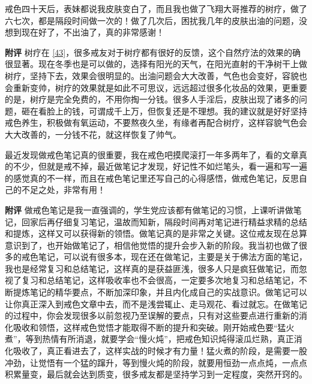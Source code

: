 \begin{case}
    戒色四十天后，表妹都说我皮肤变白了，而且我也做了飞翔大哥推荐的树疗，做了六七次，都是隔段时间做一次的！做了几次后，困扰我几年的皮肤出油的问题，没想到现在好了，不出油了，真的非常感谢！

    \textbf{附评} 树疗在 \ref{43}，很多戒友对于树疗都有很好的反馈，这个自然疗法的效果的确很显著。现在冬季也是可以做的，选择有阳光的天气，在阳光直射的干净树干上做树疗，坚持下去，效果会很明显的。出油问题会大大改善，气色也会变好，容貌也会重新变帅，树疗的效果就是如此不可思议，远远超过很多化妆品的效果，更重要的是，树疗是完全免费的，不用你掏一分钱。很多人手淫后，皮肤出现了诸多的问题，砸在看脸上的钱，可谓成千上万，但恢复还是不理想。我的建议就是好好坚持戒色养生，积极做有氧运动，不要熬夜久坐，有缘者再配合树疗，这样容貌气色会大大改善的，一分钱不花，就这样恢复了帅气。
\end{case}

\begin{case}
    最近发现做戒色笔记真的很重要，我在戒色吧摸爬滚打一年多两年了，看的文章真的不少，但就是戒不掉，最近做笔记才发现，好记性不如烂笔头，看一遍和写一遍的感觉真的不一样，而且在戒色笔记里还写自己的心得感悟，做戒色笔记，反思自己的不足之处，非常有用！

    \textbf{附评} 做戒色笔记是我一直强调的，学生党应该都有做笔记的习惯，上课听讲做笔记，回家后再仔细复习笔记，温故而知新，隔段时间再对笔记进行精益求精的总结和提炼，这样又可以获得新的领悟。做笔记真的是非常之关键。这位戒友现在总算意识到了，也开始做笔记了，相信他觉悟的提升会步入新的阶段。我当初也做了很多的戒色笔记，可以说有很多本，现在还在做笔记，主要是关于佛法方面的笔记，我也是经常复习和总结笔记，这样真的是获益匪浅，很多人只是疯狂做笔记，而忽视了复习和总结笔记，这样吸收率也不会很高，一定要多次地复习和总结笔记，不断提炼笔记的精华要点，不断加深印象，并且内化成自己的实战意识。做笔记可以让你真正深入到戒色文章中去，而不是浅尝辄止、走马观花、看过就忘。在做笔记的过程中，你会发现很多以前忽视乃至误解的要点，只有对这些要点进行重新的消化吸收和领悟，这样戒色觉悟才能取得不断的提升和突破。刚开始戒色要“猛火煮”，等到热情有所消退，就要学会“慢火炖”，把戒色知识炖得滚瓜烂熟，真正消化吸收了，真正看进去了，这样实战的时候才有力量！猛火煮的阶段，是需要一股冲劲，让觉悟有一个猛的蹿升，等到慢火炖的阶段，就要用恒劲一点点炖，一点点积累量变，最后就会达到质变，很多戒友都是坚持学习到一定程度，突然开窍的。
\end{case}

